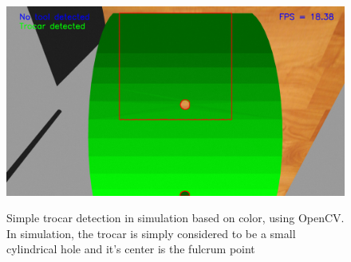 \begin{center}
\begin{figure}[!htb]
\centering
\includegraphics[width=12cm]{images/opencv-trocar-detection.png}\\
\caption{Simple trocar detection in simulation based on color, using OpenCV. In simulation, the trocar is simply considered to be a small 
cylindrical hole and it's center is the fulcrum point}
\end{figure}
\end{center}

